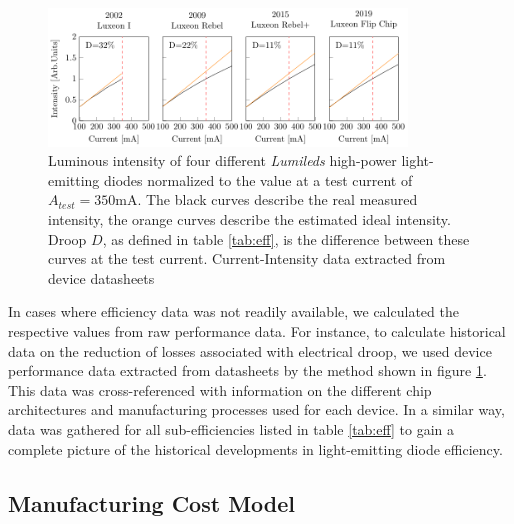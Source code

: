 \documentclass[a4paper,nocompress]{spie}  %
\begin{document}
        \begin{figure} [ht]
            \begin{center}
                \includegraphics[width=0.85\textwidth]{droop_lumileds.pdf}
            \end{center}
            \caption{Luminous intensity of four different \textit{Lumileds} high-power light-emitting diodes normalized to the value at a test current of $A_{test}=350$mA. The black curves describe the real measured intensity, the orange curves describe the estimated ideal intensity. Droop $D$, as defined in table \ref{tab:eff}, is the difference between these curves at the test current. Current-Intensity data extracted from device datasheets \cite{datasheet_lumileds_lux1,datasheet_lumileds_rebel,datasheet_lumileds_rebplus,lumi2019data}}
            \label{fig:droop}
        \end{figure}
        
        In cases where efficiency data was not readily available, we calculated the respective values from raw performance data. For instance, to calculate historical data on the reduction of losses associated with electrical droop, we used device performance data extracted from datasheets by the method shown in figure \ref{fig:droop}. This data was cross-referenced with information on the different chip architectures and manufacturing processes used for each device. In a similar way, data was gathered for all sub-efficiencies listed in table \ref{tab:eff} to gain a complete picture of the historical developments in light-emitting diode efficiency.

    \subsection{Manufacturing Cost Model}
    \label{subsec:costmodel}
    
\end{document}

